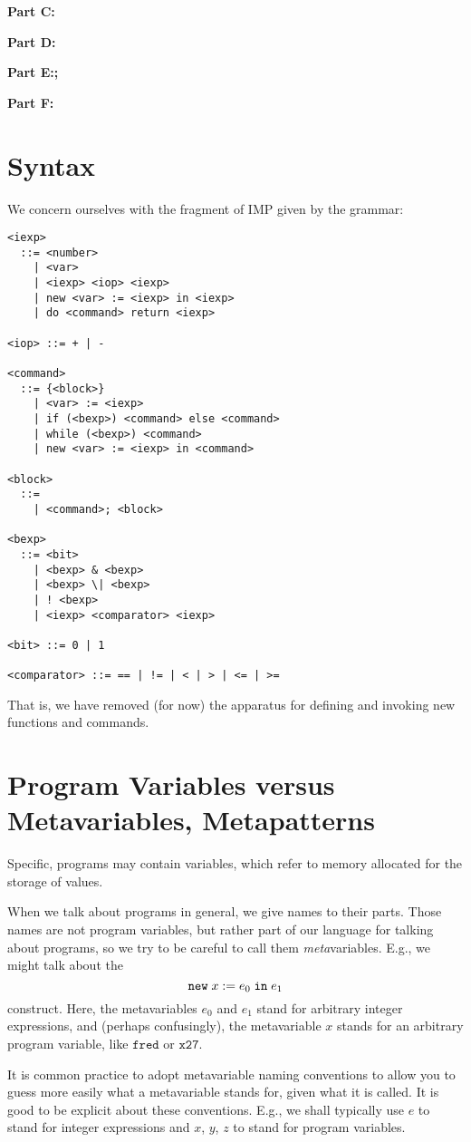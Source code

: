 \documentclass{article}
\begin{document}
{\bf Part C:}

{\bf Part D:}

{\bf Part E:;}

{\bf Part F:}

\section{Syntax}

We concern ourselves with the fragment of IMP given by the grammar:

\begin{verbatim}
<iexp>
  ::= <number>
    | <var>
    | <iexp> <iop> <iexp>
    | new <var> := <iexp> in <iexp>
    | do <command> return <iexp>

<iop> ::= + | -

<command>
  ::= {<block>}
    | <var> := <iexp>
    | if (<bexp>) <command> else <command>
    | while (<bexp>) <command>
    | new <var> := <iexp> in <command>

<block>
  ::=
    | <command>; <block>

<bexp>
  ::= <bit>
    | <bexp> & <bexp>
    | <bexp> \| <bexp>
    | ! <bexp>
    | <iexp> <comparator> <iexp>

<bit> ::= 0 | 1

<comparator> ::= == | != | < | > | <= | >=
\end{verbatim}

That is, we have removed (for now) the apparatus for defining and invoking new functions and commands.


\section{Program Variables versus Metavariables, Metapatterns}

Specific, programs may contain variables, which refer to memory allocated for the storage of values.

When we talk about programs in general, we give names to their parts. Those names are not program variables, but rather part of our language for talking about programs, so we try to be careful to call them \emph{meta}variables. E.g., we might talk about the
\[
  \mathtt{new}\;x\;\mathtt{:=}\;e_0\;\mathtt{in}\;e_1
\]
construct. Here, the metavariables $e_0$ and $e_1$ stand for arbitrary integer expressions, and (perhaps confusingly), the metavariable $x$ stands for an arbitrary program variable, like $\mathtt{fred}$ or $\mathtt{x27}$.

It is common practice to adopt metavariable naming conventions to allow you to guess more easily what a metavariable stands for, given what it is called. It is good to be explicit about these conventions. E.g., we shall typically use $e$ to stand for integer expressions and $x$, $y$, $z$ to stand for program variables.
\end{document}
